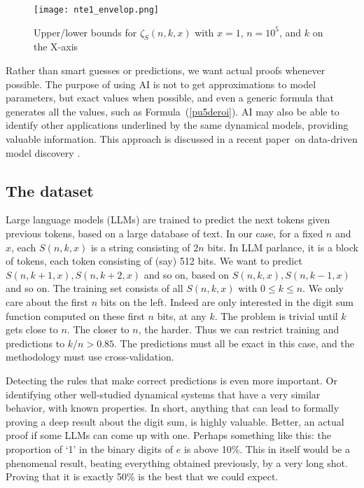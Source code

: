 \documentclass[10pt]{article}
\begin{document}
\begin{figure}[H]
\centering
\texttt{[image: nte1\_envelop.png]}
\caption{Upper/lower bounds for $\zeta_S(n,k,x)$ with $x=1$, $n=10^5$, and $k$ on the X-axis}
\label{fig:g60fll8vgp}
\end{figure}

\noindent Rather than smart guesses or predictions, we want actual proofs whenever possible. The purpose of using AI is not to get approximations to model parameters, but exact values when possible, and even a generic formula that generates all the
 values, such as Formula~(\ref{pu5deroi}). AI may also be able to identify other applications underlined by the same dynamical models,
 providing valuable information. This approach is discussed in a recent paper~on data-driven model discovery  \cite{ddmd24}.

\subsection{The dataset}

Large language models (LLMs) are trained to predict the next tokens given previous tokens, based on a large database of text. In our case, for a fixed $n$ and $x$, each $S(n, k, x)$ is a string consisting of $2n$ bits. In LLM parlance, it is a block of tokens, each token consisting of (say) 
 512 bits. We want to predict $S(n, k+1, x), S(n, k+2, x)$ and so on, based on $S(n, k, x), S(n, k-1, x)$ and so on. The training set
 consists of all $S(n, k, x)$ with $0\leq k \leq n$. We only care about the first $n$ bits on the left. Indeed are only interested in the
 digit sum function computed on these first $n$ bits, at any $k$. The problem is trivial until $k$ gets close to $n$. 
The closer to $n$, the harder.
Thus we can restrict training and predictions to  $k /n> 0.85$. The predictions must all be exact in this case, and the methodology 
 must use cross-validation. 

Detecting the rules that make correct predictions is even more important. Or identifying other well-studied dynamical systems that have a very similar behavior, with known properties. In short, anything that can lead to formally proving a deep result about the digit sum, is highly valuable. 
Better, an actual proof if some LLMs can come up with one. Perhaps something like this: the proportion of `1' in the binary digits of $e$ is above 10\%. This in itself would be a phenomenal result, beating everything obtained previously, by a very long shot.  Proving that it is exactly 50\% is the best that we could expect.
\end{document}

